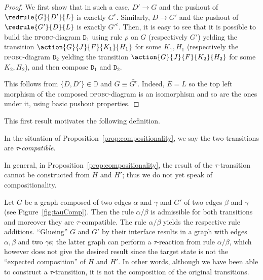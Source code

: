 \begin{proof}
  We first show that in such a case, $D' \rightarrow G$ and the pushout of $\redrule{G}{D'}{L}$ is exactly $G^c$. Similarly, $D \rightarrow G'$ and the pushout of $\redrule{G'}{D}{L}$ is exactly $G'^c$.
  Then, it is easy to see that it is possible to build the
  \textsc{dpobc}-diagram $\mathtt D_1$  using rule $\rho$  on $G$
  (respectively $G'$) yelding the transition
  $\action{G}{J}{F}{K_1}{H_1}$ for some $K_1,H_1$ (respectively the
  \textsc{dpobc}-diagram $\mathtt D_2$ yelding the transition
  $\action{G}{J}{F}{K_2}{H_2}$ for some $K_2,H_2$), and then compose
  $\mathtt D_1$ and $\mathtt D_2$.









This follows from  $\{D,D'\} \in \mathbb D$ and $\bar G \equiv \bar {G^c}$.
Indeed, $\bar E = L$ so the top left morphism of the composed \textsc{dpobc}-diagram is an isomorphism
and so are the ones under it, using basic pushout properties.
\end{proof}

This first result  motivates the following definition. 
\begin{definition}
  In the situation of Proposition~\ref{prop:compositionality}, 
  we say the two transitions  are $\tau$-\emph{compatible}. 
\end{definition}

\begin{remark}
  In general, in Proposition~\ref{prop:compositionality}, 
  the result of the $\tau$-transition cannot be constructed from $H$ and $H'$;
  thus we do not yet speak of compositionality.
\end{remark}

\begin{example}
  Let $G$ be a graph composed of two edges $\alpha$ and $\gamma$ and $G'$ of two edges $\beta$ and $\gamma$  (see Figure~\ref{fig:tauComp}).
  Then the rule $\alpha/\beta$ is admissible for both transitions
  and moreover they are $\tau$-compatible. 
  The rule $\alpha/\beta$ yields the respective rule additions.
  ``Glueing'' $G$ and $G'$ by their interface results in a graph with edges $\alpha, \beta$ and two $\gamma$s;
  the latter graph  can perform a $\tau$-reaction  from rule $\alpha/\beta$,
  which however does not give the desired result
  since the target state is not the ``expected  composition'' of $H$ and $H'$. 
  In other words, 
  although we have been able to  construct a $\tau$-transition,
  it is not the composition of the original transitions.
\end{example}

